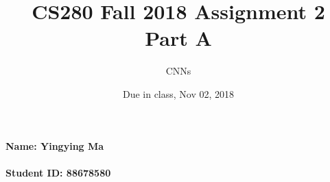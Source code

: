 \documentclass[12pt]{article}%
\begin{document}
	
	\title{CS280 Fall 2018 Assignment 2 \\ Part A}
	\author{CNNs}
	\date{Due in class, Nov 02, 2018}
	\maketitle
	
	\paragraph{Name: Yingying Ma}
	
	\paragraph{Student ID: 88678580}
	
	\newpage
	
\end{document}
